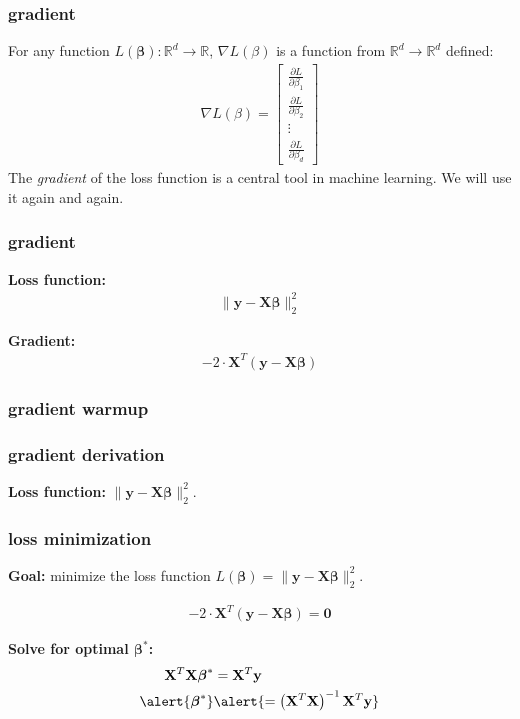 \documentclass[handout,compress]{beamer}
\newcommand{\bs}[1]{\boldsymbol{#1}}
\newcommand{\bv}[1]{\mathbf{#1}}
\newcommand{\R}{\mathbb{R}}
\begin{document}
\begin{frame}
	\frametitle{gradient}
	For any function $L(\bs{\beta}): \R^{d} \rightarrow \R$, $\nabla L(\beta)$ is a function from $\R^d \rightarrow \R^d$ defined:
	\begin{align*}
	\nabla L(\beta) = \begin{bmatrix}
	\frac{\partial L}{\partial \beta_1} \\ \frac{\partial L}{\partial \beta_2} \\ \vdots \\ \frac{\partial L}{\partial \beta_d}
	\end{bmatrix}
	\end{align*}
	The \emph{gradient} of the loss function is a central tool in machine learning. We will use it again and again. 
\end{frame}

\begin{frame}[t]
	\frametitle{gradient}
	\textbf{Loss function:}
	\begin{align*}
	\|\bv{y} - \bv{X}\bs{\beta}\|_2^2
	\end{align*}
	
	\textbf{Gradient:}
	\begin{align*}
	-2\cdot \bv{X}^T(\bv{y} - \bv{X}\bs{\beta})
	\end{align*}
	
\end{frame}

\begin{frame}[t]
	\frametitle{gradient warmup}
	
\end{frame}



\begin{frame}[t]
	\frametitle{gradient derivation}
	\begin{center}
	\textbf{Loss function:} $\|\bv{y} - \bv{X}\bs{\beta}\|_2^2$. 
	\end{center}
	
\end{frame}

\begin{frame}[t]
		\frametitle{loss minimization}
	\textbf{Goal:} minimize the loss function $L(\bs{\beta}) = \|\bv{y} - \bv{X}\bs{\beta}\|_2^2$.
	
	\begin{align*}
	-2\cdot \bv{X}^T(\bv{y} - \bv{X}\bs{\beta}) = \bv{0}
	\end{align*}
	
	\textbf{Solve for optimal $\bs{\beta}^*$:}
	\begin{align*}
	\bv{X}^T\bv{X}\bs{\beta}^* &= \bv{X}^T\bv{y} \\
	\alert{\bs{\beta}^*} &\alert{= \left(\bv{X}^T\bv{X}\right)^{-1}\bv{X}^T\bv{y}}
	\end{align*}
\end{frame}
\end{document}
